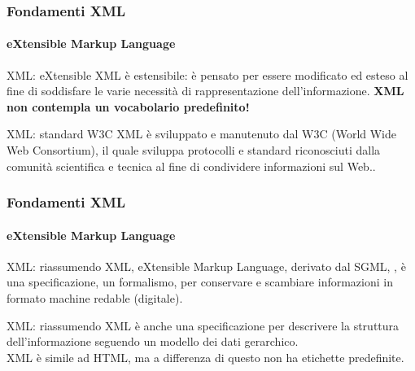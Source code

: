 \begin{frame}
	\frametitle{Fondamenti XML}
	\framesubtitle{eXtensible Markup Language}
	\addtocounter{nframe}{1}

	\begin{block}{XML: eXtensible}
		XML è estensibile: è pensato per essere modificato ed esteso al fine di soddisfare le varie necessità di rappresentazione dell'informazione.
		\textbf{XML non contempla un vocabolario predefinito!}
	\end{block}

	\begin{block} {XML: standard W3C}
		XML è sviluppato e manutenuto dal W3C (World Wide Web Consortium), il quale sviluppa protocolli e standard riconosciuti dalla comunità scientifica e tecnica al fine di condividere informazioni sul Web..
	\end{block}
\end{frame}

\begin{frame}
	\frametitle{Fondamenti XML}
	\framesubtitle{eXtensible Markup Language}
	\addtocounter{nframe}{1}

	\begin{block}{XML: riassumendo}
		XML, eXtensible Markup Language, derivato dal SGML, , 
		è una specificazione, un formalismo, per conservare e scambiare informazioni in formato machine redable (digitale).
	\end{block}

	\begin{block}{XML: riassumendo}
		XML è anche una specificazione per descrivere la struttura dell'informazione seguendo un modello dei dati gerarchico.
		\\ XML è simile ad HTML, ma a differenza di questo non ha etichette predefinite.
	\end{block}

\end{frame}



